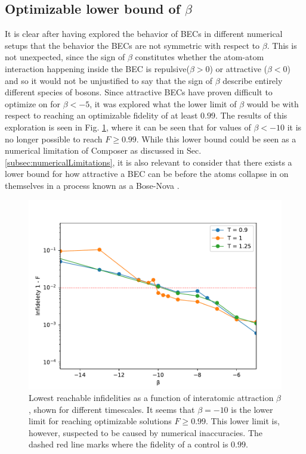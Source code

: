 \documentclass[a4paper, twocolumn]{revtex4-1}
\begin{document}
\subsection{Optimizable lower bound of $\beta$}

It is clear after having explored the behavior of BECs in different numerical setups that the behavior the BECs are not symmetric with respect to $\beta$. This is not unexpected, since the sign of $\beta$ constitutes whether the atom-atom interaction happening inside the BEC is repulsive($\beta>0$) or attractive ($\beta<0$) and so it would not be unjustified to say that the sign of $\beta$ describe entirely different species of bosons. Since attractive BECs have proven difficult to optimize on for $\beta<-5$, it was explored what the lower limit of $\beta$ would be with respect to reaching an optimizable fidelity of at least $0.99$. The results of this exploration is seen in Fig. \ref{fig:reachable_neg_betas}, where it can be seen that for values of $\beta<-10$ it is no longer possible to reach $F\geq0.99$. While this lower bound could be seen as a numerical limitation of Composer as discussed in Sec. \ref{subsec:numericalLimitations}, it is also relevant to consider that there exists a lower bound for how attractive a BEC can be before the atoms collapse in on themselves in a process known as a Bose-Nova \cite{Donley2001}.


\begin{figure}
	\includegraphics[width=\columnwidth]{graphics/exploration/reachable_neg_beta.pdf}
	\caption{Lowest reachable infidelities as a function of interatomic attraction $\beta$, shown for different timescales. It seems that $\beta=-10$ is the lower limit for reaching optimizable solutions $F\geq0.99$. This lower limit is, however, suspected to be caused by numerical inaccuracies. The dashed red line marks where the fidelity of a control is $0.99$.}
	\label{fig:reachable_neg_betas}
\end{figure}
\end{document}
